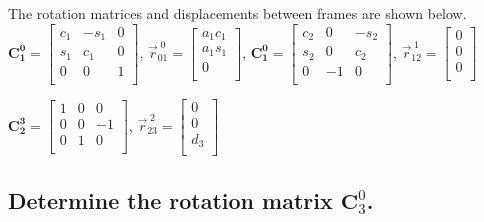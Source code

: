 \documentclass[12pt,letterpaper, onecolumn]{exam}
\begin{document}
\begin{questions}
{        The rotation matrices and displacements between frames are shown below.
        \centering
        $\mathbf{C_1^0} =
            \begin{bmatrix}
                c_1 & -s_1 & 0 \\
                s_1 & c_1  & 0 \\
                0   & 0    & 1 \\
            \end{bmatrix}
        $,\quad
        $\vec{r}^{\;0}_{01} =
            \begin{bmatrix}
                a_1c_1 \\
                a_1s_1 \\
                0      \\
            \end{bmatrix}
        $,\quad
        $\mathbf{C_1^0} =
            \begin{bmatrix}
                c_2 & 0  & -s_2 \\
                s_2 & 0  & c_2  \\
                0   & -1 & 0    \\
            \end{bmatrix}
        $,\quad
        $\vec{r}^{\;1}_{12} =
            \begin{bmatrix}
                0 \\
                0 \\
                0 \\
            \end{bmatrix}$

        \qquad\qquad\qquad\qquad\qquad
        $\mathbf{C_2^3} =
            \begin{bmatrix}
                1 & 0 & 0  \\
                0 & 0 & -1 \\
                0 & 1 & 0  \\
            \end{bmatrix}
        $,\quad
        $\vec{r}^{\;2}_{23} =
            \begin{bmatrix}
                0   \\
                0   \\
                d_3 \\
            \end{bmatrix}
        $
    }
    \begin{parts}
        \part{Determine the rotation matrix $\mathbf{C}_3^0$.}


\end{parts}
\end{questions}
\end{document}
